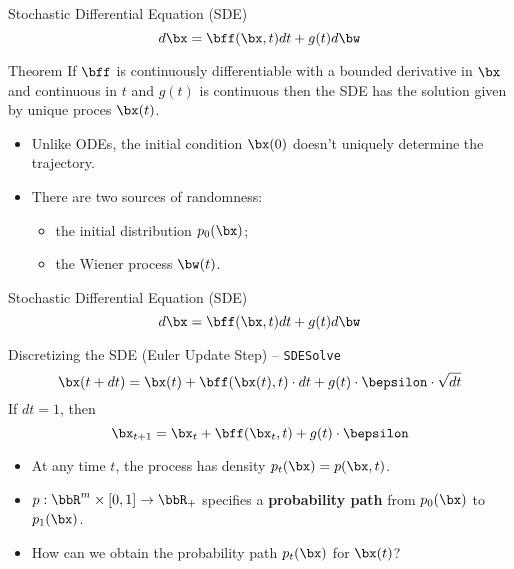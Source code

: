 \documentclass{beamer}
\begin{document}
\begin{frame}{Stochastic Differential Equation (SDE)}
	\[
		d\bx = \bff(\bx, t) dt + g(t) d \bw
	\]
	\begin{block}{Theorem}
		If $\bff$ is continuously differentiable with a bounded derivative in $\bx$ and continuous in $t$ and $g(t)$ is continuous then the SDE has the solution given by unique proces $\bx(t)$.
	\end{block}

	\begin{itemize}
		\item Unlike ODEs, the initial condition $\bx(0)$ doesn't uniquely determine the trajectory.
		\item There are two sources of randomness: 
		\begin{itemize}
			\item the initial distribution $p_0(\bx)$;
			\item the Wiener process $\bw(t)$.
		\end{itemize}
	\end{itemize}
\end{frame}
\begin{frame}{Stochastic Differential Equation (SDE)}
	\[
		d\bx = \bff(\bx, t) dt + g(t) d \bw
	\]
	\vspace{-0.3cm}
	\eqpause
	\begin{block}{Discretizing the SDE (Euler Update Step) – \texttt{SDESolve}}
		\vspace{-0.3cm}
		\[
			\bx(t + dt) = \bx(t) + \bff(\bx(t), t) \cdot dt + g(t) \cdot \bepsilon \cdot \sqrt{dt}
		\]
		If $dt=1$, then
		\vspace{-0.3cm}
		\[
			\bx_{t + 1} = \bx_t + \bff(\bx_t, t) + g(t) \cdot \bepsilon
		\]
		\vspace{-0.7cm}
	\end{block}
	\eqpause
	\begin{itemize}
		\item At any time $t$, the process has density $p_t(\bx) = p(\bx, t)$.
		\item $p: \bbR^m \times [0,1] \rightarrow \bbR_+$ specifies a \textbf{probability path} from $p_0(\bx)$ to $p_1(\bx)$.
		\item How can we obtain the probability path $p_t(\bx)$ for $\bx(t)$?
	\end{itemize}
\end{frame}
\end{document}
